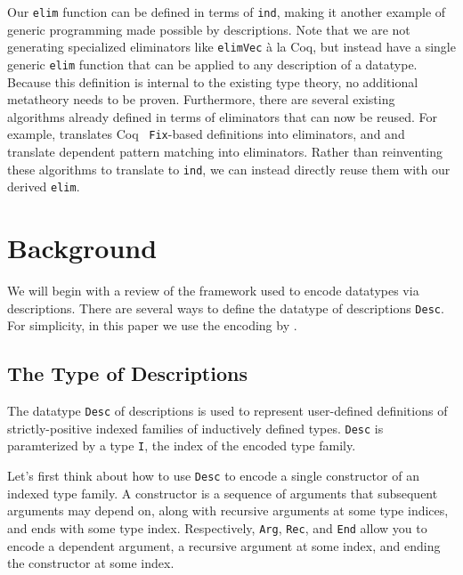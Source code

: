 \documentclass[preprint,nonatbib]{sigplanconf}
\begin{document}

Our {\tt elim} function can be defined in terms of
{\tt ind}, making it another example of generic programming made
possible by descriptions.
Note that we are not generating specialized eliminators like
{\tt elimVec} à la {\sc Coq}, but instead have a single generic
{\tt elim} function that can be applied to any description of a
datatype.
Because this definition is internal to the
existing type theory, no additional metatheory needs to be proven.
Furthermore, there are several existing algorithms already defined in
terms of eliminators that can now be reused.
For example, \citet{gimenez1995codifying} translates
{\sc Coq}~\citeyearpar{coq08} {\tt Fix}-based definitions into eliminators,
and \citet{Goguen06eliminatingdependent} and
\citet{McBride:2000:EM:646540.759262}
translate dependent pattern matching into
eliminators. Rather than reinventing these algorithms to translate to
{\tt ind}, we can instead directly reuse them with our derived {\tt elim}.

\section{Background}
\label{sec:background}

We will begin with a review of the framework used to encode datatypes
via descriptions. There are
several ways to define the datatype of descriptions {\tt Desc}. 
For simplicity, in this paper we use the encoding by
\citet{mcbride2010ornamental}.

\subsection{The Type of Descriptions}

The datatype {\tt Desc} of descriptions is used to represent
user-defined definitions of strictly-positive indexed
families of inductively defined types.
{\tt Desc} is paramterized by 
a type {\tt I}, the index of the encoded type family.

Let's first think about how to use {\tt Desc} to encode a single
constructor of an indexed type family.
A constructor is a sequence of
arguments that subsequent arguments may depend on, along with
recursive arguments at some type indices, and ends with some type index.
Respectively, {\tt Arg}, {\tt Rec}, and {\tt End} allow you to encode
a dependent argument, a recursive argument at some index, and ending the
constructor at some index.
\end{document}

